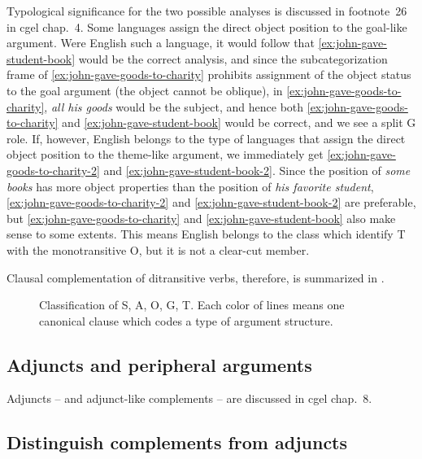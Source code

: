 \documentclass{article}
\newcommand*{\citechap}[1]{chap.~{#1}}
\newcommand*{\citefootnote}[1]{footnote~{#1}}
\newcommand*{\corpus}[1]{\emph{#1}}
\begin{document}
Typological significance for the two possible analyses is discussed in
\citefootnote{26} in \ac{cgel} \citechap{4}.
Some languages assign the direct object position to the goal-like argument.
Were English such a language, 
it would follow that \eqref{ex:john-gave-student-book} would be the correct analysis,
and since the subcategorization frame of \eqref{ex:john-gave-goods-to-charity} 
prohibits assignment of the object status to the goal argument
(the object cannot be oblique),
in \eqref{ex:john-gave-goods-to-charity},
\corpus{all his goods} would be the subject,
and hence both \eqref{ex:john-gave-goods-to-charity} and \eqref{ex:john-gave-student-book} 
would be correct,
and we see a split G role.
If, however, English belongs to the type of languages 
that assign the direct object position to the theme-like argument,
we immediately get \eqref{ex:john-gave-goods-to-charity-2} and \eqref{ex:john-gave-student-book-2}.
Since the position of \corpus{some books} has more object properties 
than the position of \corpus{his favorite student},
\eqref{ex:john-gave-goods-to-charity-2} and \eqref{ex:john-gave-student-book-2} are preferable,
but \eqref{ex:john-gave-goods-to-charity} and \eqref{ex:john-gave-student-book} also make sense 
to some extents.
This means English belongs to the class which identify T with the monotransitive O, 
but it is not a clear-cut member.

Clausal complementation of ditransitive verbs, therefore, is summarized in .

\begin{figure}
    \centering
    
    \caption{Classification of S, A, O, G, T. Each color of lines means one canonical clause which codes a type of argument structure.}
    \label{fig:ditransitive-gt}
\end{figure}



\subsection{Adjuncts and peripheral arguments}\label{sec:adjuncts-classification}

Adjuncts -- and adjunct-like complements -- are discussed in \ac{cgel} \citechap{8}.

\subsection{Distinguish complements from adjuncts}\label{sec:recognizing-complement-clause}
\end{document}
